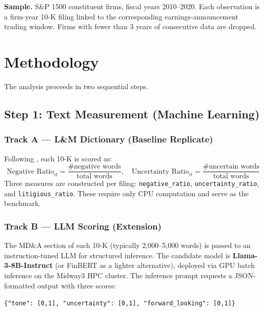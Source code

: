\documentclass[12pt]{article}
\begin{document}
\noindent\textbf{Sample.} S\&P 1500 constituent firms, fiscal years 2010--2020.
Each observation is a firm-year 10-K filing linked to the corresponding
earnings-announcement trading window. Firms with fewer than 3 years of
consecutive data are dropped.

\section{Methodology}

The analysis proceeds in two sequential steps.

\subsection{Step 1: Text Measurement (Machine Learning)}

\subsubsection{Track A — L\&M Dictionary (Baseline Replicate)}

Following \citet{LoughranMcDonald2011}, each 10-K is scored as:
\begin{equation}
    \text{Negative Ratio}_{it} = \frac{\text{\# negative words}}{\text{total words}}, \quad
    \text{Uncertainty Ratio}_{it} = \frac{\text{\# uncertain words}}{\text{total words}}
\end{equation}
Three measures are constructed per filing: \texttt{negative\_ratio},
\texttt{uncertainty\_ratio}, and \texttt{litigious\_ratio}. These require only
CPU computation and serve as the benchmark.

\subsubsection{Track B — LLM Scoring (Extension)}

The MD\&A section of each 10-K (typically 2,000--5,000 words) is passed to an
instruction-tuned LLM for structured inference. The candidate model is
\textbf{Llama-3-8B-Instruct} (or FinBERT as a lighter alternative), deployed
via GPU batch inference on the Midway3 HPC cluster. The inference prompt
requests a JSON-formatted output with three scores:

\begin{center}
\texttt{\{"tone": [0,1], "uncertainty": [0,1], "forward\_looking": [0,1]\}}
\end{center}
\end{document}
